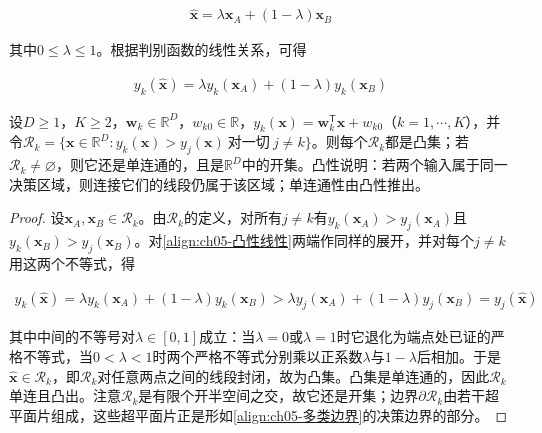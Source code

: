 \documentclass[../../main.tex]{subfiles}
\begin{document}
\begin{align}
  \hat{\boldsymbol{x}}=\lambda\boldsymbol{x}_A+(1-\lambda)\boldsymbol{x}_B
  \label{align:ch05-凸组合}
\end{align}

其中$0\leqslant\lambda\leqslant 1$。根据判别函数的线性关系，可得

\begin{align}
  y_k(\hat{\boldsymbol{x}})=\lambda y_k(\boldsymbol{x}_A)+(1-\lambda)y_k(\boldsymbol{x}_B)
  \label{align:ch05-凸性线性}
\end{align}

\begin{proposition}[多类线性判别式的决策区域是凸的]\label{proposition:ch05-多类决策区域凸性}
设$D\geqslant1$，$K\geqslant2$，$\boldsymbol{w}_k\in\mathbb{R}^{D}$，$w_{k0}\in\mathbb{R}$，$y_k(\boldsymbol{x})=\boldsymbol{w}_k^{\mathsf{T}}\boldsymbol{x}+w_{k0}$（$k=1,\cdots,K$），并令$\mathcal{R}_k=\{\boldsymbol{x}\in\mathbb{R}^{D}:y_k(\boldsymbol{x})>y_j(\boldsymbol{x})\ \text{对一切}\ j\neq k\}$。则每个$\mathcal{R}_k$都是凸集；若$\mathcal{R}_k\neq\varnothing$，则它还是单连通的，且是$\mathbb{R}^{D}$中的开集。凸性说明：若两个输入属于同一决策区域，则连接它们的线段仍属于该区域；单连通性由凸性推出。
\end{proposition}

\begin{proof}
设$\boldsymbol{x}_A,\boldsymbol{x}_B\in\mathcal{R}_k$。由$\mathcal{R}_k$的定义，对所有$j\neq k$有$y_k(\boldsymbol{x}_A)>y_j(\boldsymbol{x}_A)$且$y_k(\boldsymbol{x}_B)>y_j(\boldsymbol{x}_B)$。对\eqref{align:ch05-凸性线性}两端作同样的展开，并对每个$j\neq k$用这两个不等式，得

\begin{align}
  y_k(\hat{\boldsymbol{x}})=\lambda y_k(\boldsymbol{x}_A)+(1-\lambda)y_k(\boldsymbol{x}_B)>\lambda y_j(\boldsymbol{x}_A)+(1-\lambda)y_j(\boldsymbol{x}_B)=y_j(\hat{\boldsymbol{x}})
\end{align}

其中中间的不等号对$\lambda\in[0,1]$成立：当$\lambda=0$或$\lambda=1$时它退化为端点处已证的严格不等式，当$0<\lambda<1$时两个严格不等式分别乘以正系数$\lambda$与$1-\lambda$后相加。于是$\hat{\boldsymbol{x}}\in\mathcal{R}_k$，即$\mathcal{R}_k$对任意两点之间的线段封闭，故为凸集。凸集是单连通的，因此$\mathcal{R}_k$单连且凸出。注意$\mathcal{R}_k$是有限个开半空间之交，故它还是开集；边界$\partial\mathcal{R}_k$由若干超平面片组成，这些超平面片正是形如\eqref{align:ch05-多类边界}的决策边界的部分。
\end{proof}
\end{document}
